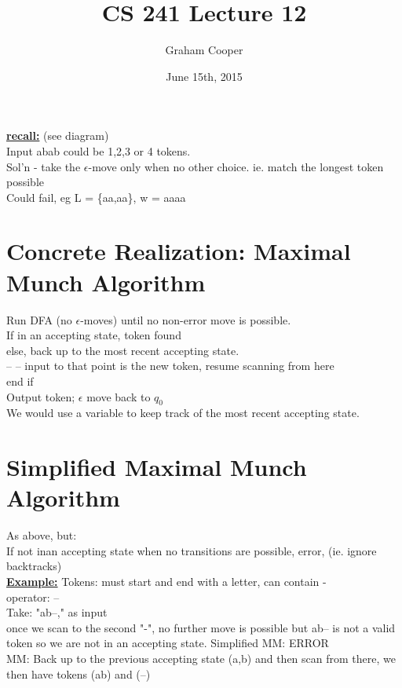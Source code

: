 \documentclass[12pt]{article}
\title{\vspace{-15ex}CS 241 Lecture 12\vspace{-1ex}}
\date{June 15th, 2015}
\author{Graham Cooper}
\newcommand{\myt}[1]{\textbf{\underline{#1}}}
\begin{document}
	\maketitle
	
	\myt{recall:} (see diagram)\\
	Input abab could be 1,2,3 or 4 tokens. \\
	Sol'n - take the $\epsilon$-move only when no other choice. ie. match the longest token possible\\
	Could fail, eg L = \{aa,aa\}, w = aaaa\\
	
	\section*{Concrete Realization: Maximal Munch Algorithm}
	Run DFA (no $\epsilon$-moves) until no non-error move is possible.\\
	If in an accepting state, token found\\
	else, back up to the most recent accepting state.\\
	-- -- input to that point is the new token, resume scanning from here\\
	end if\\
	Output token; $\epsilon$ move back to $q_0$\\
	
	We would use a variable to keep track of the most recent accepting state.\\
	
	\section*{Simplified Maximal Munch Algorithm}
	As above, but:\\
	If not inan accepting state when no transitions are possible, error, (ie. ignore backtracks)\\
	
	\myt{Example:}
	 Tokens: must start and end with a letter, can contain -\\
	 operator: --\\
	 Take: "ab--," as input\\
	 
	 once we scan to the second "-", no further move is possible but ab-- is not a valid token so we are not in an accepting state. 
	 Simplified MM: ERROR\\
	 MM: Back up to the previous accepting state (a,b) and then scan from there, we then have tokens (ab) and (--)\\
	 
\end{document}

